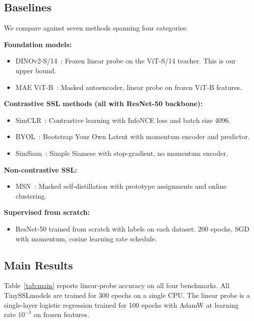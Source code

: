 \documentclass{article}
\newcommand{\method}{TinySSL}
\begin{document}
\subsection{Baselines}

We compare against seven methods spanning four categories:

\textbf{Foundation models:}
\begin{itemize}
    \item DINOv2-S/14~\cite{dino2}: Frozen linear probe on the ViT-S/14 teacher. This is our upper bound.
    \item MAE ViT-B~\cite{mae}: Masked autoencoder, linear probe on frozen ViT-B features.
\end{itemize}

\textbf{Contrastive SSL methods (all with ResNet-50 backbone):}
\begin{itemize}
    \item SimCLR~\cite{simclr}: Contrastive learning with InfoNCE loss and batch size 4096.
    \item BYOL~\cite{byol}: Bootstrap Your Own Latent with momentum encoder and predictor.
    \item SimSiam~\cite{simsiam}: Simple Siamese with stop-gradient, no momentum encoder.
\end{itemize}

\textbf{Non-contrastive SSL:}
\begin{itemize}
    \item MSN~\cite{msn}: Masked self-distillation with prototype assignments and online clustering.
\end{itemize}

\textbf{Supervised from scratch:}
\begin{itemize}
    \item ResNet-50 trained from scratch with labels on each dataset. 200 epochs, SGD with momentum, cosine learning rate schedule.
\end{itemize}

\subsection{Main Results}

Table~\ref{tab:main} reports linear-probe accuracy on all four benchmarks. All \method models are trained for 300 epochs on a single CPU. The linear probe is a single-layer logistic regression trained for 100 epochs with AdamW at learning rate $10^{-3}$ on frozen features.
\end{document}
